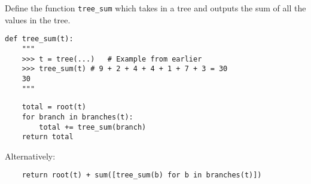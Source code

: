 \begin{blocksection}
\question Define the function \lstinline$tree_sum$ which takes in a
tree and outputs the sum of all the values in the tree.

\begin{lstlisting}
def tree_sum(t):
    """
    >>> t = tree(...)   # Example from earlier
    >>> tree_sum(t) # 9 + 2 + 4 + 4 + 1 + 7 + 3 = 30
    30
    """
\end{lstlisting}

\begin{solution}[1in]
\begin{lstlisting}
    total = root(t)
    for branch in branches(t):
        total += tree_sum(branch)
    return total
\end{lstlisting}

Alternatively:

\begin{lstlisting}
    return root(t) + sum([tree_sum(b) for b in branches(t)])
\end{lstlisting}
\end{solution}
\end{blocksection}
